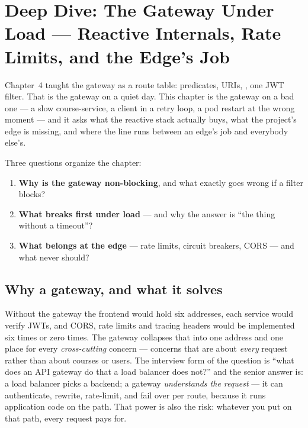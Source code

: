 \chapter{Deep Dive: The Gateway Under Load --- Reactive Internals, Rate Limits, and the Edge's Job}
\label{ch:dd-gateway}

Chapter~4 taught the gateway as a route table: predicates, 
URIs, , one JWT filter. That is the gateway on a quiet
day. This chapter is the gateway on a bad one --- a slow course-service,
a client in a retry loop, a pod restart at the wrong moment --- and it
asks what the reactive stack actually buys, what the project's edge is
missing, and where the line runs between an edge's job and everybody
else's.

Three questions organize the chapter:

\begin{enumerate}
  \item \textbf{Why is the gateway non-blocking}, and what exactly goes
  wrong if a filter blocks?
  \item \textbf{What breaks first under load} --- and why the answer is
  ``the thing without a timeout''?
  \item \textbf{What belongs at the edge} --- rate limits, circuit
  breakers, CORS --- and what never should?
\end{enumerate}

\section{Why a gateway, and what it solves}

Without the gateway the frontend would hold six addresses, each service
would verify JWTs, and CORS, rate limits and tracing headers would be
implemented six times or zero times. The gateway collapses that into one
address and one place for every \emph{cross-cutting} concern --- concerns
that are about \emph{every} request rather than about courses or users.
The interview form of the question is ``what does an API gateway do that
a load balancer does not?'' and the senior answer is: a load balancer
picks a backend; a gateway \emph{understands the request} --- it can
authenticate, rewrite, rate-limit, and fail over per route, because it
runs application code on the path. That power is also the risk: whatever
you put on that path, every request pays for.


